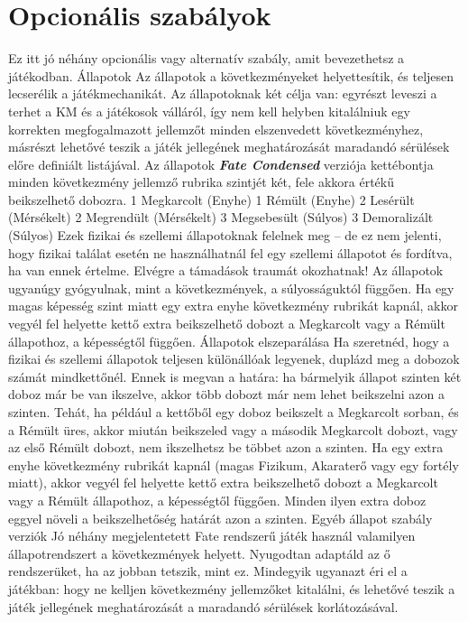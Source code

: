 \documentclass[oneside]{book}
\newcommand{\fate}[1]{\textbf{\textit{#1}}}
\begin{document}
\chapter{Opcionális szabályok}
Ez itt jó néhány opcionális vagy alternatív szabály, amit bevezethetsz a játékodban.
Állapotok
Az állapotok a következményeket helyettesítik, és teljesen lecserélik a játékmechanikát. Az állapotoknak két célja van: egyrészt leveszi a terhet a KM és a játékosok válláról, így nem kell helyben kitalálniuk egy korrekten megfogalmazott jellemzőt minden elszenvedett következményhez, másrészt lehetővé teszik a játék jellegének meghatározását maradandó sérülések előre definiált listájával.
Az állapotok \fate{Fate Condensed} verziója kettébontja minden következmény jellemző rubrika szintjét két, fele akkora értékű beikszelhető dobozra.
1 Megkarcolt (Enyhe)
1 Rémült (Enyhe)
2 Lesérült (Mérsékelt)
2 Megrendült (Mérsékelt)
3 Megsebesült (Súlyos)
3 Demoralizált (Súlyos)
Ezek fizikai és szellemi állapotoknak felelnek meg – de ez nem jelenti, hogy fizikai találat esetén ne használhatnál fel egy szellemi állapotot és fordítva, ha van ennek értelme. Elvégre a támadások traumát okozhatnak!
Az állapotok ugyanúgy gyógyulnak, mint a következmények, a súlyosságuktól függően.
Ha egy magas képesség szint miatt egy extra enyhe következmény rubrikát kapnál, akkor vegyél fel helyette kettő extra beikszelhető dobozt a Megkarcolt vagy a Rémült állapothoz, a képességtől függően.
Állapotok elszeparálása
Ha szeretnéd, hogy a fizikai és szellemi állapotok teljesen különállóak legyenek, duplázd meg a dobozok számát mindkettőnél. Ennek is megvan a határa: ha bármelyik állapot szinten két doboz már be van ikszelve, akkor több dobozt már nem lehet beikszelni azon a szinten. Tehát, ha például a kettőből egy doboz beikszelt a Megkarcolt sorban, és a Rémült üres, akkor miután beikszeled vagy a második Megkarcolt dobozt, vagy az első Rémült dobozt, nem ikszelhetsz be többet azon a szinten.
Ha egy extra enyhe következmény rubrikát kapnál (magas Fizikum, Akaraterő vagy egy fortély miatt), akkor vegyél fel helyette kettő extra beikszelhető dobozt a Megkarcolt vagy a Rémült állapothoz, a képességtől függően. Minden ilyen extra doboz eggyel növeli a beikszelhetőség határát azon a szinten.
Egyéb állapot szabály verziók
Jó néhány megjelentetett Fate rendszerű játék használ valamilyen állapotrendszert a következmények helyett. Nyugodtan adaptáld az ő rendszerüket, ha az jobban tetszik, mint ez. Mindegyik ugyanazt éri el a játékban: hogy ne kelljen következmény jellemzőket kitalálni, és lehetővé teszik a játék jellegének meghatározását a maradandó sérülések korlátozásával.
\end{document}
